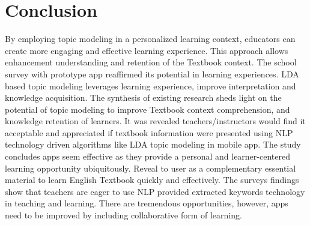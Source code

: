 \documentclass[sn-mathphys,Numbered]{sn-jnl}%
\theoremstyle{thmstyleone}%
\theoremstyle{thmstyletwo}%
\theoremstyle{thmstylethree}%
\begin{document}
\section{Conclusion}\label{conclu}
By employing topic modeling in a personalized learning context,
educators can create more engaging and effective learning experience.
This approach allows enhancement understanding and retention of the
Textbook context. The school survey with prototype app reaffirmed its
potential in learning experiences. LDA based topic modeling leverages
learning experience, improve interpretation and knowledge acquisition.
The synthesis of existing research sheds light on the potential of topic
modeling to improve Textbook context comprehension, and knowledge
retention of learners. It was revealed teachers/instructors would find
it acceptable and appreciated if textbook information were presented
using NLP technology driven algorithms like LDA topic modeling in mobile
app. The study concludes apps seem effective as they provide a personal
and learner-centered learning opportunity ubiquitously. Reveal to user
as a complementary essential material to learn English Textbook quickly
and effectively. The survey\textquotesingle s findings show that teachers are eager to use NLP provided extracted keywords technology in teaching and learning. There are tremendous opportunities, however, apps need to be improved by including
collaborative form of learning.

 
\end{document}

